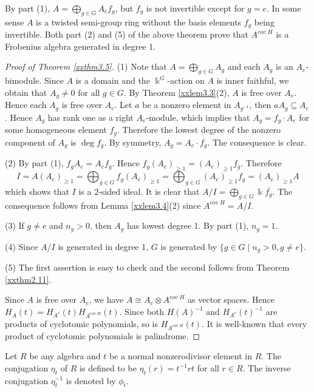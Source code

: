 By part (1), $A=\bigoplus_{g\in G} A_e f_g$, but $f_g$ is not invertible
except for $g=e$. In some sense $A$ is a twisted semi-group 
ring without the basis elements $f_g$ being invertible.
Both part (2) and (5) of the above theorem prove
that $A^{cov\; H}$ is a Frobenius algebra 
generated in degree 1. 

\begin{proof}[Proof of Theorem \ref{xxthm3.5}]
(1) Note that $A=\bigoplus_{g\in G} A_g$ and each $A_g$ is an 
$A_e$-bimodule. Since $A$ is a domain and the $\Bbbk^G$-action on $A$ is inner 
faithful, we obtain that $A_g\neq 0$ for all $g\in G$. By Theorem 
\ref{xxlem3.3}(2), $A$ is free over $A_e$.  Hence each $A_g$ is free 
over $A_e$. Let $a$ be a nonzero element in $A_{g^{-1}}$, then 
$a A_{g}\subseteq A_e$. Hence $A_{g}$ has rank one as a right 
$A_e$-module, which implies that $A_g=f_g \cdot A_e$ for some 
homogeneous element $f_g$. Therefore the lowest degree of the nonzero 
component of $A_g$ is $\deg f_g$. By symmetry, $A_g=A_e \cdot f_g$.
The consequence is clear.

(2) By part (1), $f_g A_e=A_e f_g$. Hence $f_g (A_e)_{\geq 1}=
(A_e)_{\geq 1} f_g$. Therefore
$$I=A (A_e)_{\geq 1}=\bigoplus_{g\in G} f_g (A_e)_{\geq 1}=
\bigoplus_{g\in G}(A_e)_{\geq 1} f_g =(A_e)_{\geq 1} A$$
which shows that $I$ is a 2-sided ideal. It is clear that 
$A/I=\bigoplus_{g\in G} \Bbbk \overline{f_g}$. The consequence 
follows from Lemma \ref{xxlem3.4}(2) since $A^{cov \; H}=A/I$.

(3) If $g\neq e$ and $n_g>0$, then $A_g$ has lowest degree 1. By 
part (1), $n_g=1$. 

(4) Since $A/I$ is generated in degree 1, $G$ is generated by 
$\{g\in G\mid n_g>0, g\neq e\}$.

(5) The first assertion is easy to check and the second
follows from Theorem \ref{xxthm2.11}.

Since $A$ is free over $A_e$, we have 
$A\cong A_e\otimes A^{cov\; H}$ as vector
spaces. Hence $H_A(t)=H_{A^e}(t) H_{A^{cov\; H}}(t)$.
Since both $H(A)^{-1}$ and $H_{A^e}(t)^{-1}$ are products of
cyclotomic polynomials, so is $H_{A^{cov\; H}}(t)$. 
It is well-known that 
every product of cyclotomic polynomials is palindrome.
\end{proof}

Let $R$ be any algebra and $t$ be a normal nonzerodivisor 
element in $R$. The conjugation $\eta_t$ of $R$ is defined to 
be $\eta_t(r)= t^{-1} r t$ for all $r\in R$. The inverse
conjugation $\eta^{-1}_t$ is denoted by $\phi_t$.

